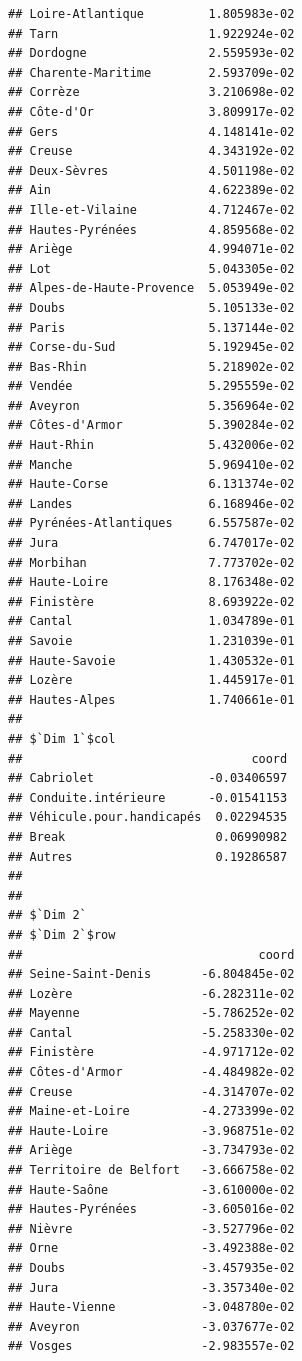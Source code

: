 \documentclass[]{book}
\begin{document}
\begin{verbatim}
## Loire-Atlantique         1.805983e-02
## Tarn                     1.922924e-02
## Dordogne                 2.559593e-02
## Charente-Maritime        2.593709e-02
## Corrèze                  3.210698e-02
## Côte-d'Or                3.809917e-02
## Gers                     4.148141e-02
## Creuse                   4.343192e-02
## Deux-Sèvres              4.501198e-02
## Ain                      4.622389e-02
## Ille-et-Vilaine          4.712467e-02
## Hautes-Pyrénées          4.859568e-02
## Ariège                   4.994071e-02
## Lot                      5.043305e-02
## Alpes-de-Haute-Provence  5.053949e-02
## Doubs                    5.105133e-02
## Paris                    5.137144e-02
## Corse-du-Sud             5.192945e-02
## Bas-Rhin                 5.218902e-02
## Vendée                   5.295559e-02
## Aveyron                  5.356964e-02
## Côtes-d'Armor            5.390284e-02
## Haut-Rhin                5.432006e-02
## Manche                   5.969410e-02
## Haute-Corse              6.131374e-02
## Landes                   6.168946e-02
## Pyrénées-Atlantiques     6.557587e-02
## Jura                     6.747017e-02
## Morbihan                 7.773702e-02
## Haute-Loire              8.176348e-02
## Finistère                8.693922e-02
## Cantal                   1.034789e-01
## Savoie                   1.231039e-01
## Haute-Savoie             1.430532e-01
## Lozère                   1.445917e-01
## Hautes-Alpes             1.740661e-01
## 
## $`Dim 1`$col
##                                coord
## Cabriolet                -0.03406597
## Conduite.intérieure      -0.01541153
## Véhicule.pour.handicapés  0.02294535
## Break                     0.06990982
## Autres                    0.19286587
## 
## 
## $`Dim 2`
## $`Dim 2`$row
##                                 coord
## Seine-Saint-Denis       -6.804845e-02
## Lozère                  -6.282311e-02
## Mayenne                 -5.786252e-02
## Cantal                  -5.258330e-02
## Finistère               -4.971712e-02
## Côtes-d'Armor           -4.484982e-02
## Creuse                  -4.314707e-02
## Maine-et-Loire          -4.273399e-02
## Haute-Loire             -3.968751e-02
## Ariège                  -3.734793e-02
## Territoire de Belfort   -3.666758e-02
## Haute-Saône             -3.610000e-02
## Hautes-Pyrénées         -3.605016e-02
## Nièvre                  -3.527796e-02
## Orne                    -3.492388e-02
## Doubs                   -3.457935e-02
## Jura                    -3.357340e-02
## Haute-Vienne            -3.048780e-02
## Aveyron                 -3.037677e-02
## Vosges                  -2.983557e-02

\end{verbatim}
\end{document}
